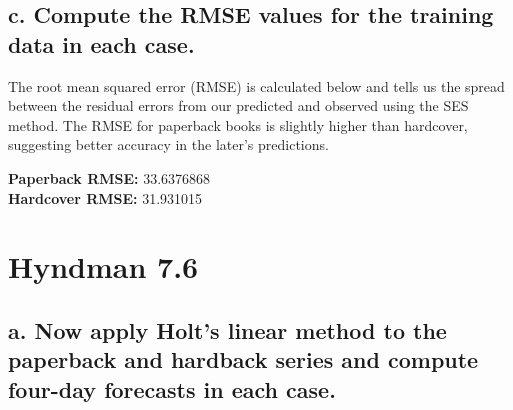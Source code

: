 \documentclass[openany]{book}
\newenvironment{Shaded}{\begin{snugshade}}{\end{snugshade}}
\newcommand{\CommentTok}[1]{\textcolor[rgb]{0.56,0.35,0.01}{\textit{#1}}}
\newcommand{\DecValTok}[1]{\textcolor[rgb]{0.00,0.00,0.81}{#1}}
\newcommand{\KeywordTok}[1]{\textcolor[rgb]{0.13,0.29,0.53}{\textbf{#1}}}
\newcommand{\NormalTok}[1]{#1}
\newcommand{\OperatorTok}[1]{\textcolor[rgb]{0.81,0.36,0.00}{\textbf{#1}}}
\begin{document}
\hypertarget{c.-compute-the-rmse-values-for-the-training-data-in-each-case.}{%
\subsection{c. Compute the RMSE values for the training data in each case.}\label{c.-compute-the-rmse-values-for-the-training-data-in-each-case.}}

The root mean squared error (RMSE) is calculated below and tells us the spread between the residual errors from our predicted and observed using the SES method. The RMSE for paperback books is slightly higher than hardcover, suggesting better accuracy in the later's predictions.

\begin{Shaded}
\end{Shaded}

\textbf{Paperback RMSE:} 33.6376868\\
\textbf{Hardcover RMSE:} 31.931015

\hypertarget{hyndman-7.6}{%
\section{Hyndman 7.6}\label{hyndman-7.6}}

\hypertarget{a.-now-apply-holts-linear-method-to-the-paperback-and-hardback-series-and-compute-four-day-forecasts-in-each-case.}{%
\subsection{a. Now apply Holt's linear method to the paperback and hardback series and compute four-day forecasts in each case.}\label{a.-now-apply-holts-linear-method-to-the-paperback-and-hardback-series-and-compute-four-day-forecasts-in-each-case.}}
\end{document}
